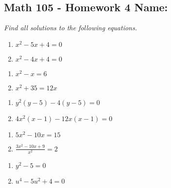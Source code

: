 \documentclass[11pt]{article}
\newcommand{\ds}{\displaystyle}
\begin{document}
\pagestyle{empty}
\subsection*{Math 105 - Homework 4 \hfill Name: \underline{\hspace*{2in}}}
\textit{Find all solutions to the following equations.}

\begin{multicols}{2}
\begin{enumerate}
\item $x^2 - 5x + 4 = 0$ 
\item $x^2 - 4x + 4 = 0$ 
\setcounter{enumCount}{\theenumi}
\end{enumerate}
\end{multicols}
\vfill

\begin{multicols}{2}
\begin{enumerate}
\setcounter{enumi}{\theenumCount}
\item $x^2 - x = 6$ 
\item $x^2 + 35 = 12 x$ 
\setcounter{enumCount}{\theenumi}
\end{enumerate}
\end{multicols}

\vfill
\begin{multicols}{2}
\begin{enumerate}
\setcounter{enumi}{\theenumCount}
\item $y^2(y-5)-4(y-5) = 0$ 
\item $4x^2(x-1) - 12x(x-1) = 0$ 
\setcounter{enumCount}{\theenumi}
\end{enumerate}
\end{multicols}
\vfill


\begin{multicols}{2}
\begin{enumerate}
\setcounter{enumi}{\theenumCount}
\item $5x^2 - 10x = 15$ 
\item $\ds \frac{3x^2 - 10x + 9}{x^2} = 2$ 
\setcounter{enumCount}{\theenumi}
\end{enumerate}
\end{multicols}
\vfill


\begin{multicols}{2}
\begin{enumerate}
\setcounter{enumi}{\theenumCount}
\item $y^2-5 = 0$ 
\item $\ds u^4 - 5u^2 + 4 = 0$ 
\setcounter{enumCount}{\theenumi}
\end{enumerate}
\end{multicols}
\vfill
\end{document}
